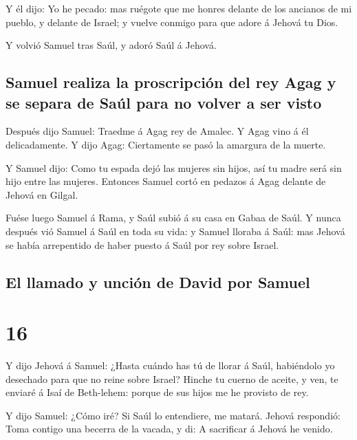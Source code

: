  Y él dijo: Yo he pecado: mas ruégote que me honres
delante de los ancianos de mi pueblo, y delante de Israel; y vuelve
conmigo para que adore á Jehová tu Dios.

 Y volvió Samuel tras Saúl, y adoró Saúl á Jehová.

\hypertarget{samuel-realiza-la-proscripciuxf3n-del-rey-agag-y-se-separa-de-sauxfal-para-no-volver-a-ser-visto}{%
\subsection{Samuel realiza la proscripción del rey Agag y se separa de
Saúl para no volver a ser
visto}\label{samuel-realiza-la-proscripciuxf3n-del-rey-agag-y-se-separa-de-sauxfal-para-no-volver-a-ser-visto}}

 Después dijo Samuel: Traedme á Agag rey de Amalec. Y
Agag vino á él delicadamente. Y dijo Agag: Ciertamente se pasó la
amargura de la muerte.

 Y Samuel dijo: Como tu espada dejó las mujeres sin
hijos, así tu madre será sin hijo entre las mujeres. Entonces Samuel
cortó en pedazos á Agag delante de Jehová en Gilgal.

 Fuése luego Samuel á Rama, y Saúl subió á su casa en
Gabaa de Saúl.  Y nunca después vió Samuel á Saúl en toda
su vida: y Samuel lloraba á Saúl: mas Jehová se había arrepentido de
haber puesto á Saúl por rey sobre Israel.

\hypertarget{el-llamado-y-unciuxf3n-de-david-por-samuel}{%
\subsection{El llamado y unción de David por
Samuel}\label{el-llamado-y-unciuxf3n-de-david-por-samuel}}

\hypertarget{section-15}{%
\section{16}\label{section-15}}

 Y dijo Jehová á Samuel: ¿Hasta cuándo has tú de llorar á
Saúl, habiéndolo yo desechado para que no reine sobre Israel? Hinche tu
cuerno de aceite, y ven, te enviaré á Isaí de Beth-lehem: porque de sus
hijos me he provisto de rey.

 Y dijo Samuel: ¿Cómo iré? Si Saúl lo entendiere, me
matará. Jehová respondió: Toma contigo una becerra de la vacada, y di: A
sacrificar á Jehová he venido.

